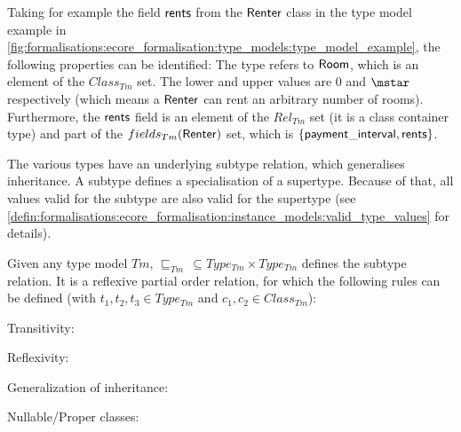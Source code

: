 Taking for example the field $\type{rents}$ from the $\type{Renter}$ class in the type model example in \cref{fig:formalisations:ecore_formalisation:type_models:type_model_example}, the following properties can be identified: The type refers to $\type{Room}$, which is an element of the $Class_{Tm}$ set. The
lower and upper values are $0$ and $\mstar$ respectively (which means a $\type{Renter}$ can rent an arbitrary number of rooms). Furthermore, the $\type{rents}$ field is an element of the $Rel_{Tm}$ set (it is a class container type) and part of the $fields_{Tm}(\type{Renter})$ set, which is $\{ \type{payment\_interval}, \type{rents} \}$.

The various types have an underlying subtype relation, which generalises inheritance. A subtype defines a specialisation of a supertype. Because of that, all values valid for the subtype are also valid for the supertype (see \cref{defin:formalisations:ecore_formalisation:instance_models:valid_type_values} for details).

\begin{defin}
\label{defin:formalisations:ecore_formalisation:type_models:subtype_relation}
Given any type model $Tm$, $\sqsubseteq_{Tm}\, \subseteq Type_{Tm} \times Type_{Tm}$ defines the subtype relation. It is a reflexive partial order relation, for which the following rules
can be defined (with $t_1, t_2, t_3 \in Type_{Tm}$ and $c_1, c_2 \in Class_{Tm}$):

Transitivity:
\begin{mathpar}
\end{mathpar}

Reflexivity:
\begin{mathpar}
\end{mathpar}

Generalization of inheritance:

Nullable/Proper classes:
\begin{mathpar}
\end{mathpar}

\end{defin}

